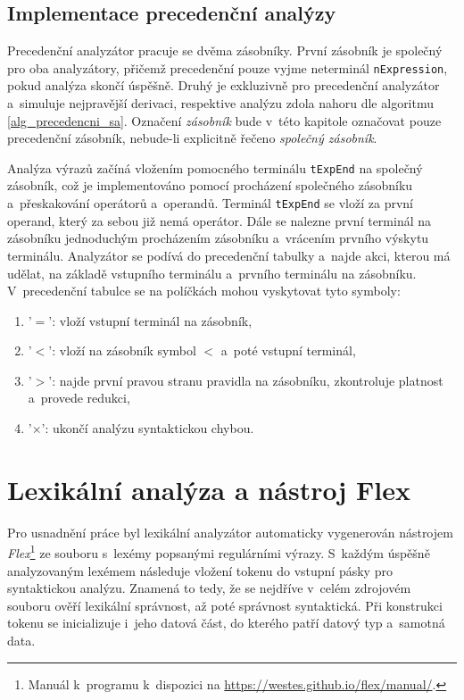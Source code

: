 \subsection*{Implementace precedenční analýzy}
Precedenční analyzátor pracuje se dvěma zásobníky.
První zásobník je společný pro oba analyzátory, přičemž precedenční pouze vyjme neterminál \texttt{nExpression}, pokud analýza skončí úspěšně.
Druhý je exkluzivně pro precedenční analyzátor a~simuluje nejpravější derivaci, respektive analýzu zdola nahoru dle algoritmu \ref{alg_precedencni_sa}.
Označení \emph{zásobník} bude v~této kapitole označovat pouze precedenční zásobník, nebude-li explicitně řečeno \emph{společný zásobník}.

Analýza výrazů začíná vložením pomocného terminálu \texttt{tExpEnd} na společný zásobník, což je implementováno pomocí procházení společného zásobníku a~přeskakování operátorů a~operandů.
Terminál \texttt{tExpEnd} se vloží za první operand, který za sebou již nemá operátor.
Dále se nalezne první terminál na zásobníku jednoduchým procházením zásobníku a~vrácením prvního výskytu terminálu.
Analyzátor se podívá do precedenční tabulky a~najde akci, kterou má udělat, na základě vstupního terminálu a~prvního terminálu na zásobníku.
V~precedenční tabulce se na políčkách mohou vyskytovat tyto symboly:
\begin{enumerate}[label=\arabic*)]
    \item '$=$': vloží vstupní terminál na zásobník,
    \item '$<$': vloží na zásobník symbol $<$ a~poté vstupní terminál,
    \item '$>$': najde první pravou stranu pravidla na zásobníku, zkontroluje platnost a~provede redukci,
    \item '$\times$': ukončí analýzu syntaktickou chybou.
\end{enumerate}

\section{Lexikální analýza a nástroj Flex}
Pro usnadnění práce byl lexikální analyzátor automaticky vygenerován nástrojem \emph{Flex}\footnote{Manuál k~programu k~dispozici na \href{https://westes.github.io/flex/manual/}{https://westes.github.io/flex/manual/}.} ze souboru s~lexémy popsanými regulárními výrazy.
S~každým úspěšně analyzovaným lexémem následuje vložení tokenu do vstupní pásky pro syntaktickou analýzu.
Znamená to tedy, že se nejdříve v~celém zdrojovém souboru ověří lexikální správnost, až poté správnost syntaktická. 
Při konstrukci tokenu se inicializuje i~jeho datová část, do kterého patří datový typ a~samotná data.

